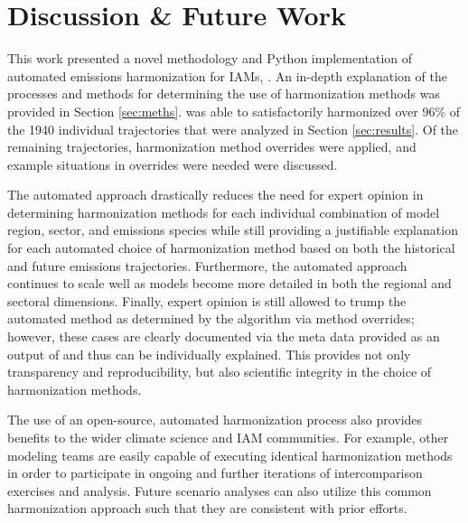 \section{Discussion \& Future Work}\label{sec:future}

This work presented a novel methodology and Python implementation of automated
emissions harmonization for IAMs, . An in-depth explanation of the
processes and methods for determining the use of harmonization methods was
provided in Section \ref{sec:meths}.  was able to satisfactorily
harmonized over 96\% of the 1940 individual trajectories that were analyzed in
% 
% 
Section \ref{sec:results}. Of the remaining trajectories, harmonization method
overrides were applied, and example situations in overrides were needed
were discussed.

The automated approach drastically reduces the need for expert opinion in
determining harmonization methods for each individual combination of model
region, sector, and emissions species while still providing a justifiable
explanation for each automated choice of harmonization method based on both the
historical and future emissions trajectories. Furthermore, the automated
approach continues to scale well as models become more detailed in both the
regional and sectoral dimensions. Finally, expert opinion is still allowed to
trump the automated method as determined by the algorithm via method overrides;
however, these cases are clearly documented via the meta data provided as an
output of  and thus can be individually explained. This provides
not only transparency and reproducibility, but also scientific integrity in the
choice of harmonization methods.

The use of an open-source, automated harmonization process also provides
benefits to the wider climate science and IAM communities. For example, other
modeling teams are easily capable of executing identical harmonization methods
in order to participate in ongoing and further iterations of intercomparison
exercises and analysis. Future scenario analyses can also utilize this common
harmonization approach such that they are consistent with prior efforts.

